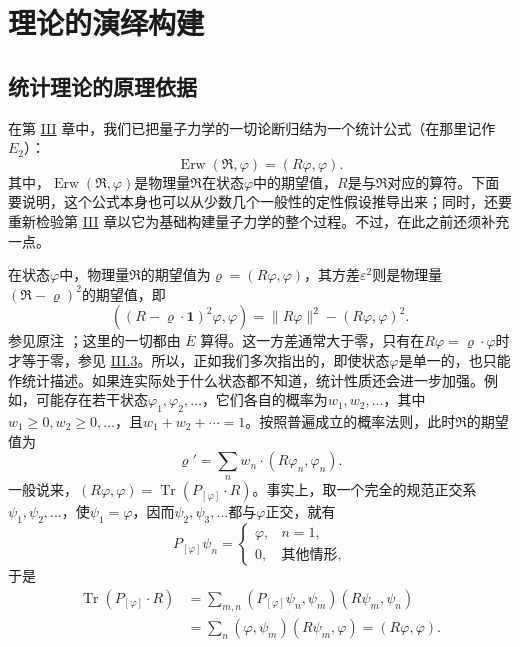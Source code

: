 \documentclass[fontsize=13pt,twoside,openany,headings=normal,parskip=false,bookmarkpackage=false,DIV=calc]{scrbook}
\begin{document}
\chapter{理论的演绎构建}\label{chap:IV}
\section{统计理论的原理依据}\label{sec:IV.1}

在第 \hyperref[chap:III]{III} 章中，我们已把量子力学的一切论断归结为一个统计公式（在那里记作 \hyperref[post:III.1.E2]{$E_2$}）：
\begin{equation}\tag{$\overline E$}\label{eq:IV.1.E}
\operatorname{Erw}(\mathfrak R,\varphi)=(R\varphi,\varphi).
\end{equation}
其中，$\operatorname{Erw}(\mathfrak R,\allowbreak \varphi)$是物理量$\mathfrak R$在状态$\varphi$中的期望值，$R$是与$\mathfrak R$对应的算符。下面要说明，这个公式本身也可以从少数几个一般性的定性假设推导出来；同时，还要重新检验第 \hyperref[chap:III]{III} 章以它为基础构建量子力学的整个过程。不过，在此之前还须补充一点。

在状态$\varphi$中，物理量$\mathfrak R$的期望值为$\varrho=(R\varphi,\allowbreak \varphi)$，其方差$\varepsilon^2$则是物理量$(\mathfrak R-\varrho)^2$的期望值，即
\[
((R-\varrho\cdot\mathbf1)^2\varphi,\varphi)=\|R\varphi\|^2-(R\varphi,\varphi)^2.
\]
参见原注 \hyperlink{note-130}{}；这里的一切都由 \hyperref[eq:IV.1.E]{$\overline E$} 算得。这一方差通常大于零，只有在$R\varphi=\varrho\cdot\varphi$时才等于零，参见 \hyperref[sec:III.3]{III.3}。所以，正如我们多次指出的，即使状态$\varphi$是单一的，也只能作统计描述。如果连实际处于什么状态都不知道，统计性质还会进一步加强。例如，可能存在若干状态$\varphi_1,\allowbreak \varphi_2,\allowbreak \ldots$，它们各自的概率为$w_1,\allowbreak w_2,\allowbreak \ldots$，其中$w_1\geq0,\allowbreak w_2\geq0,\allowbreak \ldots$，且$w_1+w_2+\cdots=1$。按照普遍成立的概率法则，此时$\mathfrak R$的期望值为
\[
\varrho'=\sum_nw_n\cdot(R\varphi_n,\varphi_n).
\]
一般说来，$(R\varphi,\allowbreak \varphi)=\operatorname{Tr}(P_{[\varphi]}\cdot R)$。事实上，取一个完全的规范正交系$\psi_1,\allowbreak \psi_2,\allowbreak \ldots$，使$\psi_1=\varphi$，因而$\psi_2,\allowbreak \psi_3,\allowbreak \ldots$都与$\varphi$正交，就有
\[
P_{[\varphi]}\psi_n=\begin{cases}\varphi,&n=1,\\0,&\text{其他情形},\end{cases}
\]
于是
\begin{align*}
\operatorname{Tr}(P_{[\varphi]}\cdot R)
&=\sum_{m,n}(P_{[\varphi]}\psi_n,\psi_m)(R\psi_m,\psi_n)\\
&=\sum_n(\varphi,\psi_m)(R\psi_m,\varphi)=(R\varphi,\varphi).
\end{align*}
\end{document}
